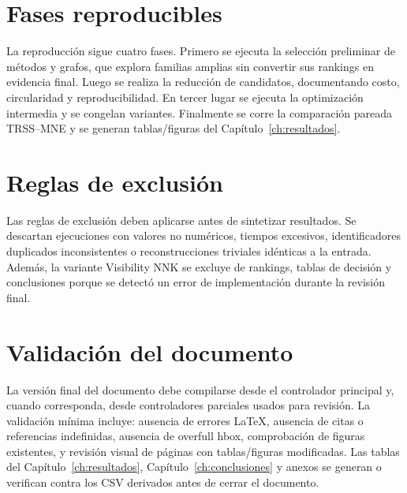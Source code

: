 \section{Fases reproducibles}

La reproducción sigue cuatro fases. Primero se ejecuta la selección preliminar de métodos y grafos, que explora familias amplias sin convertir sus rankings en evidencia final. Luego se realiza la reducción de candidatos, documentando costo, circularidad y reproducibilidad. En tercer lugar se ejecuta la optimización intermedia y se congelan variantes. Finalmente se corre la comparación pareada TRSS--MNE y se generan tablas/figuras del Capítulo~\ref{ch:resultados}.

\section{Reglas de exclusión}

Las reglas de exclusión deben aplicarse antes de sintetizar resultados. Se descartan ejecuciones con valores no numéricos, tiempos excesivos, identificadores duplicados inconsistentes o reconstrucciones triviales idénticas a la entrada. Además, la variante Visibility NNK se excluye de rankings, tablas de decisión y conclusiones porque se detectó un error de implementación durante la revisión final.

\section{Validación del documento}

La versión final del documento debe compilarse desde el controlador principal y, cuando corresponda, desde controladores parciales usados para revisión. La validación mínima incluye: ausencia de errores LaTeX, ausencia de citas o referencias indefinidas, ausencia de overfull hbox, comprobación de figuras existentes, y revisión visual de páginas con tablas/figuras modificadas. Las tablas del Capítulo~\ref{ch:resultados}, Capítulo~\ref{ch:conclusiones} y anexos se generan o verifican contra los CSV derivados antes de cerrar el documento.
